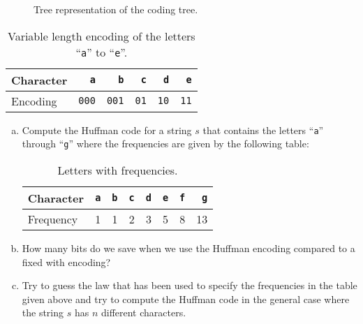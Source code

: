 \begin{figure}[!ht]
  \centering
  \caption{Tree representation of the coding tree.}
  \label{fig:coding-tree2}
\end{figure}



\begin{table}[htbp]
  \centering
\begin{tabular}[t]{|l|r|r|r|r|r|}
\hline
Character &   \texttt{a} &   \texttt{b} & \texttt{c}  & \texttt{d}  & \texttt{e}   \\
\hline
\hline
Encoding & \texttt{000} & \texttt{001} & \texttt{01} & \texttt{10} & \texttt{11} \\
\hline
\end{tabular}
  \caption{Variable length encoding of the letters ``\texttt{a}'' to ``\texttt{e}''.}
  \label{tab:coding2}
\end{table}
\pagebreak

\exercise
\begin{enumerate}[(a)]
\item Compute the Huffman code for a string $s$ that contains the letters 
      ``\texttt{a}'' through ``\texttt{g}'' where the frequencies are given by the following table:

\begin{table}[htbp]
  \centering
\begin{tabular}[t]{|l|r|r|r|r|r|r|r|}
\hline
Character  & \texttt{a} & \texttt{b} & \texttt{c} & \texttt{d} & \texttt{e} & \texttt{f} & \texttt{g} \\
\hline
\hline
Frequency &          1 &          1 &          2 &          3 &          5 &         8 &         13 \\
\hline
\end{tabular}
  \caption{Letters with frequencies.}
  \label{tab:aufgabe-huffman}
\end{table}

\item How many bits do we save when we use the Huffman encoding compared to a fixed with encoding?
\item Try to guess the law that has been used to specify the frequencies in the table given above
      and try to compute the Huffman code in the general case where the string $s$ has $n$ different
      characters. \eox
\end{enumerate}


